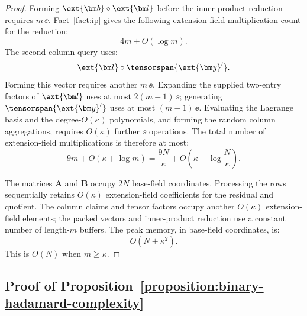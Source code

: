 \begin{proof}
Forming
\(\ext{\bm b}\circ\ext{\bm l}\) before the inner-product
reduction requires \(m\,\ee\). Fact~\ref{fact:ip} gives the
following extension-field multiplication count for the reduction:
\[
    4m+O(\log m).
\]
The second column query uses:
\[
    \ext{\bm l}
    \circ
    \tensorspan{\ext{\bm y}'}.
\]
Forming this vector requires another \(m\,\ee\).
Expanding the supplied two-entry factors of \(\ext{\bm l}\)
uses at most \(2(m-1)\,\ee\); generating
\(\tensorspan{\ext{\bm y}'}\) uses at most \((m-1)\,\ee\).
Evaluating the Lagrange basis and the degree-\(O(\kappa)\)
polynomials, and forming the random column aggregations, requires
\(O(\kappa)\) further \(\ee\) operations. The total number
of extension-field multiplications is therefore at most:
\[
    9m+O(\kappa+\log m)
    =
    \frac{9N}{\kappa}
    +
    O\left(
        \kappa+\log\frac{N}{\kappa}
    \right).
\]

The matrices \(\bm A\) and \(\bm B\) occupy \(2N\) base-field
coordinates. Processing the rows sequentially retains
\(O(\kappa)\) extension-field coefficients for the residual and
quotient. The column claims and tensor factors occupy another
\(O(\kappa)\) extension-field elements; the packed vectors and
inner-product reduction use a constant number of length-\(m\)
buffers. The peak memory, in base-field coordinates, is:
\[
    O(N+\kappa^2).
\]
This is \(O(N)\) when \(m\geq\kappa\).
\end{proof}

\subsection{Proof of Proposition~\ref{proposition:binary-hadamard-complexity}}
\label{appx:proof-binary-hadamard}

